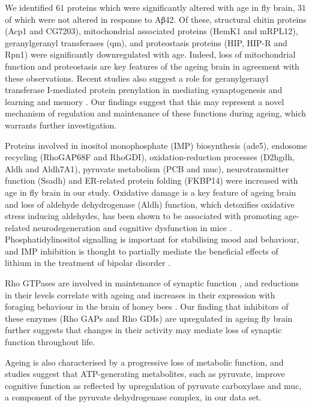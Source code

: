 We identified $61$ proteins which were significantly altered with age in fly brain,
$31$ of which were not altered in response to Aβ42.
Of these, structural chitin proteins (Acp1 and CG7203),
mitochondrial associated proteins (HemK1 and mRPL12),
geranylgeranyl transferases (qm), and proteostasis proteins (HIP, HIP-R and Rpn1)
were significantly downregulated with age.
Indeed, loss of mitochondrial function and proteostasis are key features of the ageing
brain \cite{Hou2019} in agreement with these observations.
Recent studies also suggest a role for geranylgeranyl transferase I-mediated protein
prenylation in mediating synaptogenesis and learning and memory \cite{Afshordel2014,Gao2016}.
Our findings suggest that this may represent a novel mechanism of regulation
and maintenance of these functions during ageing, which warrants further investigation.

Proteins involved in inositol monophosphate (IMP) biosynthesis (ade5),
endosome recycling (RhoGAP68F and RhoGDI), oxidation-reduction processes
(D2hgdh, Aldh and Aldh7A1), pyruvate metabolism (PCB and muc),
neurotransmitter function (Ssadh) and ER-related protein folding (FKBP14)
were increased with age in fly brain in our study.
Oxidative damage is a key feature of ageing brain and loss of aldehyde dehydrogenase
(Aldh) function, which detoxifies oxidative stress inducing aldehydes,
has been shown to be associated with promoting age-related neurodegeneration
and cognitive dysfunction in mice \cite{DSouza2015,Ohsawa2008}.
Phosphatidylinositol signalling is important for stabilising mood and behaviour,
and IMP inhibition is thought to partially mediate the beneficial effects of lithium
in the treatment of bipolar disorder \cite{Sade2016}.

Rho GTPases are involved in maintenance of synaptic function \cite{Afshordel2014},
and reductions in their levels correlate with ageing and increases in their expression
with foraging behaviour in the brain of honey bees \cite{Dobrin2012}.
Our finding that inhibitors of these enzymes (Rho GAPs and Rho GDIs) are upregulated
in ageing fly brain further suggests that changes in their activity may mediate loss of
synaptic function throughout life.

Ageing is also characterised by a progressive loss of metabolic function,
and studies suggest that ATP-generating metabolites, such as pyruvate,
improve cognitive function \cite{Owen2011} as reflected by upregulation of
pyruvate carboxylase and muc, a component of the pyruvate dehydrogenase complex,
in our data set.

